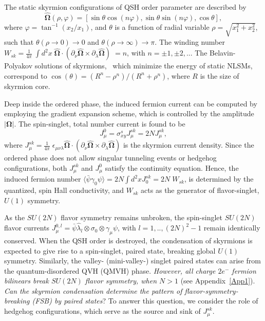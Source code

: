 \documentclass[aps,prb,amsmath,amssymb,floatfix,twocolumn]{revtex4}
\begin{document}
The static skyrmion configurations of QSH order parameter are described by 
\begin{equation}
\hat{\mathbf{\Omega}}(\rho, \varphi)=\left [\sin  \theta \cos(n \varphi), \sin  \theta \sin ( n \varphi), \cos \theta \right],\label{eq2}
\end{equation}
where $\varphi= \tan^{-1}(x_2/x_1)$, and $\theta$ is a function of radial variable $\rho= \sqrt{x^2_1 + x^2_2}$, such that $\theta(\rho \to 0) \to 0$ and $\theta(\rho \to \infty) \to \pi$. The winding number $W_{sk}=\frac{1}{4\pi} \; \int d^2x \;  \hat{\mathbf{\Omega}} \cdot (\partial_{\nu} \hat{\mathbf{\Omega}} \times \partial_\lambda  \hat{\mathbf{\Omega}}) \; = n$, with $n=\pm 1, \pm 2,..$. The Belavin-Polyakov solutions of skyrmions,~\cite{Polyakov} which minimize the energy of static NLSMs, correspond to 
$\cos(\theta)=(R^n - \rho^n)/(R^n + \rho^n)$, where $R$ is the size of skyrmion core.

Deep inside the ordered phase, the induced fermion current can be computed by employing the gradient expansion scheme, which is controlled by the amplitude $|\mathbf{\Omega}|$. The spin-singlet, total number current is found to be 
\begin{equation}
J^0_{\mu}= \sigma^s_{xy} J^{sk}_{\mu} = 2N J^{sk}_{\mu}, \label{eq3}
\end{equation} where $J^{sk}_{\mu}= \frac{1}{4\pi} \; \epsilon_{\mu \nu \lambda} \hat{\mathbf{\Omega}} \cdot (\partial_{\nu} \hat{\mathbf{\Omega}} \times \partial_\lambda  \hat{\mathbf{\Omega}})$ is the skyrmion current density. Since the ordered phase does not allow singular tunneling events or hedgehog configurations, both $J^{sk}_{\mu}$ and $J^0_{\mu}$ satisfy the continuity equation. Hence, the induced fermion number $
\langle \bar{\psi} \gamma_0 \psi \rangle =2N \int d^2x J^{sk}_{0}=2N \; W_{sk}$, 
is determined by the quantized, spin Hall conductivity, and $W_{sk}$ acts as the generator of flavor-singlet, $U(1)$ symmetry. 

As the $SU(2N)$ flavor symmetry remains unbroken, the spin-singlet $SU(2N)$ flavor currents $J^{0,l}_{\mu}= \bar{\psi} \hat{\lambda}_l \otimes \sigma_0 \otimes \gamma_\mu \psi$, with $l=1,..,(2N)^2-1$ remain identically conserved. 
When the QSH order is destroyed, the condensation of skyrmions is expected to give rise to a spin-singlet, paired state, breaking global $U(1)$ symmetry. Similarly, the valley- (mini-valley-) singlet paired states can arise from the quantum-disordered QVH (QMVH) phase. \emph{However, all charge $2e^-$ fermion bilinears break $SU(2N)$ flavor symmetry, when $N>1$} (see Appendix~\ref{App1}). \emph{Can the skyrmion condensation determine the pattern of flavor-symmetry-breaking (FSB) by paired states}? To answer this question, we consider the role of hedgehog configurations, which serve as the source and sink of $J^{sk}_{\mu}$.
\end{document}
